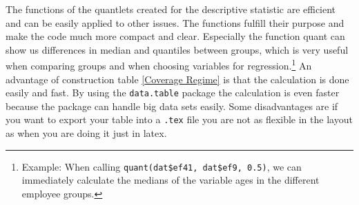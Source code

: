 The functions of the quantlets created for the descriptive statistic are efficient and can be easily applied to other issues. The functions fulfill their purpose and make the code much more compact and clear. Especially the function quant can show us differences in median and quantiles between groups, which is very useful when comparing groups and when choosing variables for regression.\footnote{ Example: When calling \texttt{quant(dat\$ef41, dat\$ef9, 0.5)}, we can immediately calculate the medians of the variable ages in the different employee groups.} An advantage of construction table \ref{Coverage Regime} is that the calculation is done easily and fast. By using the \texttt{data.table} package the calculation is even faster because the package can handle big data sets easily. Some disadvantages are if you want to export your table into a \texttt{.tex} file you are not as flexible in the layout as when you are doing it just in latex.

